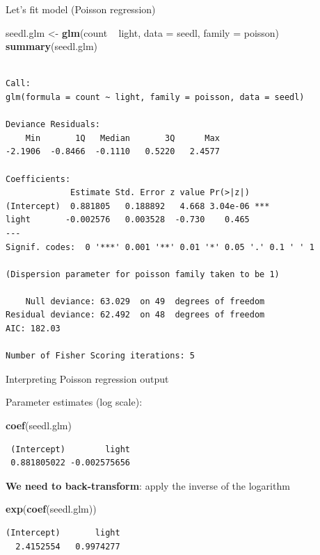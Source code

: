 \documentclass[10pt,ignorenonframetext,]{beamer}
\newenvironment{Shaded}{\begin{snugshade}}{\end{snugshade}}
\newcommand{\KeywordTok}[1]{\textcolor[rgb]{0.13,0.29,0.53}{\textbf{{#1}}}}
\newcommand{\DataTypeTok}[1]{\textcolor[rgb]{0.13,0.29,0.53}{{#1}}}
\newcommand{\StringTok}[1]{\textcolor[rgb]{0.31,0.60,0.02}{{#1}}}
\newcommand{\NormalTok}[1]{{#1}}
\begin{document}
\begin{frame}[fragile]{Let's fit model (Poisson regression)}

\begin{Shaded}
\begin{Highlighting}[]
\NormalTok{seedl.glm <-}\StringTok{ }\KeywordTok{glm}\NormalTok{(count ~}\StringTok{ }\NormalTok{light, }\DataTypeTok{data =} \NormalTok{seedl, }\DataTypeTok{family =} \NormalTok{poisson)}
\KeywordTok{summary}\NormalTok{(seedl.glm)}
\end{Highlighting}
\end{Shaded}

\begin{verbatim}

Call:
glm(formula = count ~ light, family = poisson, data = seedl)

Deviance Residuals: 
    Min       1Q   Median       3Q      Max  
-2.1906  -0.8466  -0.1110   0.5220   2.4577  

Coefficients:
             Estimate Std. Error z value Pr(>|z|)    
(Intercept)  0.881805   0.188892   4.668 3.04e-06 ***
light       -0.002576   0.003528  -0.730    0.465    
---
Signif. codes:  0 '***' 0.001 '**' 0.01 '*' 0.05 '.' 0.1 ' ' 1

(Dispersion parameter for poisson family taken to be 1)

    Null deviance: 63.029  on 49  degrees of freedom
Residual deviance: 62.492  on 48  degrees of freedom
AIC: 182.03

Number of Fisher Scoring iterations: 5
\end{verbatim}

\end{frame}

\begin{frame}[fragile]{Interpreting Poisson regression output}

Parameter estimates (log scale):

\begin{Shaded}
\begin{Highlighting}[]
\KeywordTok{coef}\NormalTok{(seedl.glm)}
\end{Highlighting}
\end{Shaded}

\begin{verbatim}
 (Intercept)        light 
 0.881805022 -0.002575656 
\end{verbatim}

\textbf{We need to back-transform}: apply the inverse of the logarithm

\begin{Shaded}
\begin{Highlighting}[]
\KeywordTok{exp}\NormalTok{(}\KeywordTok{coef}\NormalTok{(seedl.glm))}
\end{Highlighting}
\end{Shaded}

\begin{verbatim}
(Intercept)       light 
  2.4152554   0.9974277 
\end{verbatim}

\end{frame}
\end{document}
